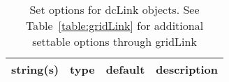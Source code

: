 \begin{table}[ht]
\centering
\begin{tabular}{p{5cm} c c p{7cm}}
\hline
string(s) & type & default & description \\
\hline
\hline
\end{tabular}
\caption{Set options for dcLink objects. See Table~\ref{table:gridLink} for additional settable options through gridLink}
\label{table:dcLink}
\end{table}
